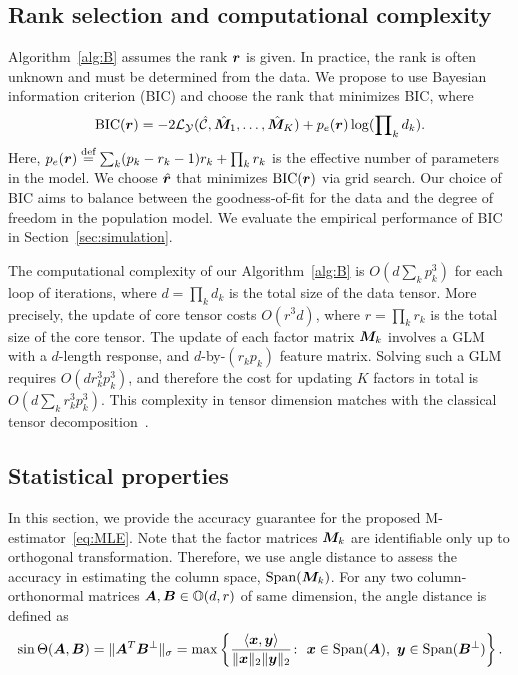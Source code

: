 \documentclass[12pt]{article}
\theoremstyle{definition}
\theoremstyle{definition}
\begin{document}
\subsection{Rank selection and computational complexity}\label{sec:tuning}
Algorithm~\ref{alg:B} assumes the rank $\bm{r}$ is given. In practice, the rank is often unknown and must be determined from the data. We propose to use Bayesian information criterion (BIC) and choose the rank that minimizes BIC, where
\begin{equation}\label{eq:BIC}
\textup{BIC}(\bm{r})=-2\mathcal{L}_{\mathcal{Y}}(\hat {\mathcal{C}}, \hat {\bm M}_1,\ldots,\hat {\bm M}_K)+p_e(\bm{r})\log (\prod\nolimits_k d_k).
\end{equation}
Here, $p_e(\bm{r})\stackrel{\textup{def}}{=}\sum_k (p_k-r_k-1)r_k+\prod_k r_k$ is the effective number of parameters in the model. We choose $\hat {\bm{r}}$ that minimizes $\textup{BIC}(\bm{r})$ via grid search. Our choice of BIC aims to balance between the goodness-of-fit for the data and the degree of freedom in the population model. We evaluate the empirical performance of BIC in Section~\ref{sec:simulation}.  

The computational complexity of our Algorithm~\ref{alg:B} is $O\left(d \sum_k p^3_k\right)$ for each loop of iterations, where $d=\prod_k d_k$ is the total size of the data tensor. More precisely, the update of core tensor costs $O(r^3d)$, where $r=\prod_k r_k$ is the total size of the core tensor. The update of each factor matrix $\bm M_k$ involves a GLM with a $d$-length response, and $d$-by-$(r_kp_k)$ feature matrix. Solving such a GLM requires $O(dr^3_kp^3_k)$, and therefore the cost for updating $K$ factors in total is $O( d\sum_k r^3_k p_k^3)$. This complexity in tensor dimension matches with the classical tensor decomposition~\citep{kolda2009tensor}. 



\subsection{Statistical properties}\label{subsec:statprob}
In this section, we provide the accuracy guarantee for the proposed M-estimator~\eqref{eq:MLE}. Note that the factor matrices $\bm M_k$ are identifiable only up to orthogonal transformation. Therefore, we use angle distance to assess the accuracy in estimating the column space, $\textup{Span}(\bm M_k)$. For any two column-orthonormal matrices $\bm A,\bm B\in\mathbb{O}(d,r)$ of same dimension, the angle distance is defined as
\[
\sin \Theta(\bm A,\bm B)=\lVert\bm A^T \bm B^{\perp}\rVert_\sigma=\max\left\{ \frac{\langle \bm x, \bm{y}\rangle}{\lVert\bm x\rVert_2\lVert\bm{y}\rVert_2}\colon \ \bm x\in \textup{Span}(\bm A),\ \bm{y}\in \textup{Span}(\bm B^{\perp})\right\}.
\]
\end{document}
